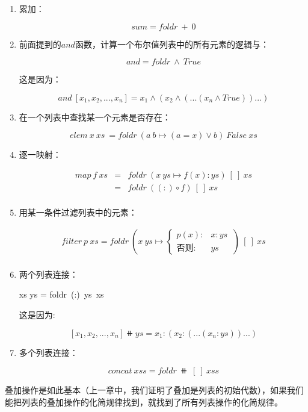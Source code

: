 \documentclass[b5paper]{ctexart}
\begin{document}
\begin{enumerate}
\item 累加：

\[
sum = foldr\ +\ 0
\]

\item 前面提到的$and$函数，计算一个布尔值列表中的所有元素的逻辑与：

\[
and = foldr\ \land\ True
\]

这是因为：

\[
and\ [x_1, x_2, ..., x_n] = x_1 \land (x_2 \land (...(x_n \land True))...)
\]

\item 在一个列表中查找某一个元素是否存在：

\[
elem\ x\ xs\ = foldr\ (a\ b \mapsto (a = x) \lor b)\ False\ xs
\]

\item 逐一映射：

\[
\begin{array}{rcl}
map\ f\ xs & = & foldr\ (x\ ys \mapsto f(x) : ys)\ [\ ]\ xs \\
           & = & foldr\ ((:) \circ f)\ [\ ]\ xs \\
\end{array}
\]

\item 用某一条件过滤列表中的元素：

\[
\begin{array}{rl}
filter\ p\ xs = foldr\ (x\ ys \mapsto
  \begin{cases}
    p(x): & x:ys\ \\
    \text{否则}: & ys
  \end{cases})\ [\ ]\ xs \\
\end{array}
\]

\item 两个列表连接：

\be
xs \doubleplus ys = foldr\ (:)\ ys\ xs
\label{eq:binary-concat}
\ee

这是因为:

\[
[x_1, x_2, ..., x_n] \doubleplus ys = x_1 : (x_2 : (...(x_n : ys))...)
\]

\item 多个列表连接：

\[
concat\ xss = foldr\ \doubleplus\ [\ ]\ xss
\]

\end{enumerate}

叠加操作是如此基本（上一章中，我们证明了叠加是列表的初始代数），如果我们能把列表的叠加操作的化简规律找到，就找到了所有列表操作的化简规律。
\end{document}
